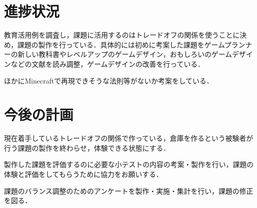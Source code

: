 \documentclass[uplatex,twocolumn,dvipdfmx]{jsarticle}
\begin{document}
\section{進捗状況}
教育活用例を調査し，課題に活用するのはトレードオフの関係を使うことに決め，課題の製作を行っている．具体的には初めに考案した課題をゲームプランナーの新しい教科書やレベルアップのゲームデザイン，おもしろいのゲームデザインなどの文献を読み調整，ゲームデザインの改善を行っている．


ほかにMinecraftで再現できそうな法則等がないか考案をしている．



\section{今後の計画}
現在着手しているトレードオフの関係で作っている，倉庫を作るという被験者が行う課題の製作を終わらせ，体験できる状態にする．


製作した課題を評価するのに必要な小テストの内容の考案・製作を行い，課題の体験と評価をしてもらうために協力をお願いする．


課題のバランス調整のためのアンケートを製作・実施・集計を行い，課題の修正を図る．




\end{document}
